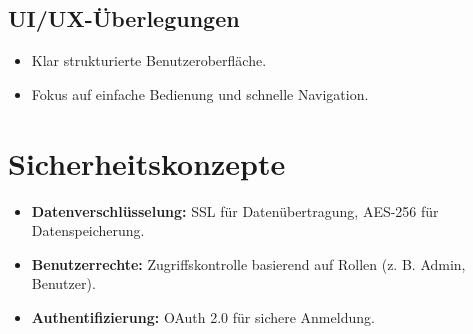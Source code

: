 \subsection{UI/UX-Überlegungen}
\begin{itemize}
    \item Klar strukturierte Benutzeroberfläche.
    \item Fokus auf einfache Bedienung und schnelle Navigation.
\end{itemize}

\section{Sicherheitskonzepte}
\begin{itemize}
    \item \textbf{Datenverschlüsselung:} SSL für Datenübertragung, AES-256 für Datenspeicherung.
    \item \textbf{Benutzerrechte:} Zugriffskontrolle basierend auf Rollen (z. B. Admin, Benutzer).
    \item \textbf{Authentifizierung:} OAuth 2.0 für sichere Anmeldung.
\end{itemize}